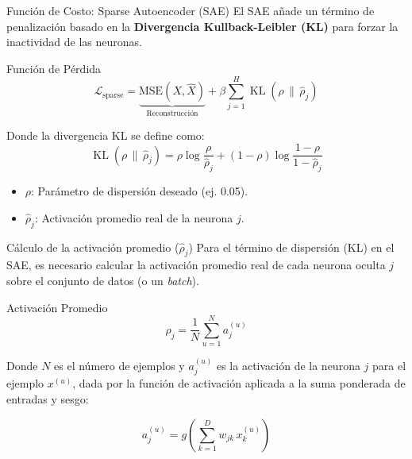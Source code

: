 \documentclass{beamer}
\begin{document}
\begin{frame}{Función de Costo: Sparse Autoencoder (SAE)}
	\small
	\justifying
	El SAE añade un término de penalización basado en la \textbf{Divergencia Kullback-Leibler (KL)} para forzar la inactividad de las neuronas.
	
	\begin{block}{Función de Pérdida}
		\begin{equation*}
			\mathcal{L}_{\text{sparse}} = \underbrace{\text{MSE}(X, \hat{X})}_{\text{Reconstrucción}} + \beta \sum_{j=1}^{H} \operatorname{KL}(\rho \,\|\, \hat{\rho}_j)
		\end{equation*}
	\end{block}
	
	Donde la divergencia KL se define como:
	\begin{equation*}
		\operatorname{KL}(\rho \,\|\, \hat{\rho}_j) = \rho \log\frac{\rho}{\hat{\rho}_j} + (1 - \rho) \log\frac{1-\rho}{1-\hat{\rho}_j}
	\end{equation*}
	
	\footnotesize
	\begin{itemize}
		\item $\rho$: Parámetro de dispersión deseado (ej. 0.05).
		\item $\hat{\rho}_j$: Activación promedio real de la neurona $j$.
	\end{itemize}
\end{frame}

\begin{frame}{Cálculo de la activación promedio ($\hat{\rho}_j$)}
	\small
	\justifying
	Para el término de dispersión (KL) en el SAE, es necesario calcular la activación promedio real de cada neurona oculta $j$ sobre el conjunto de datos (o un \emph{batch}).
	
	\begin{block}{Activación Promedio}
		\begin{equation*}
			\hat{\rho}_j = \frac{1}{N} \sum_{u=1}^{N} a_j^{(u)}
		\end{equation*}
	\end{block}
	
	\footnotesize
	Donde $N$ es el número de ejemplos y $a_j^{(u)}$ es la activación de la neurona $j$ para el ejemplo $x^{(u)}$, dada por la función de activación aplicada a la suma ponderada de entradas y sesgo:
	
	\begin{equation*}
		a_j^{(u)} = g\left( \sum_{k=1}^{D} w_{jk} \, x_k^{(u)} \right)
	\end{equation*}
\end{frame}
\end{document}
